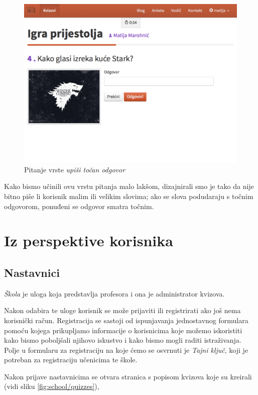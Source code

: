 \documentclass[11pt]{scrreprt}
\begin{document}
\begin{figure}[H]
  \includegraphics[width=\textwidth, clip=true, trim=0 5cm 0 0, fbox]{student/text_question}
  \caption{Pitanje vrste \emph{upiši točan odgovor}}
  \label{fig:text}
\end{figure}

Kako bismo učinili ovu vrstu pitanja malo lakšom, dizajnirali smo je tako da
nije bitno piše li korisnik malim ili velikim slovima; ako se slova podudaraju
s točnim odgovorom, ponuđeni se odgovor smatra točnim.

\section{Iz perspektive korisnika}

\subsection{Nastavnici}

\emph{Škola} je uloga koja predstavlja profesora i ona je administrator kvizova.

Nakon odabira te uloge korisnik se može prijaviti ili registrirati ako još nema
korisnički račun. Registracija se sastoji od ispunjavanja jednostavnog
formulara pomoću kojega prikupljamo informacije o korisnicima koje možemo
iskoristiti kako bismo poboljšali njihovo iskustvo i kako bismo mogli raditi
istraživanja. Polje u formularu za registraciju na koje ćemo se osvrnuti je
\emph{Tajni ključ}, koji je potreban za registraciju učenicima te škole.

Nakon prijave nastavnicima se otvara stranica s popisom kvizova koje su
kreirali (vidi sliku \ref{fig:school/quizzes}),
\end{document}
